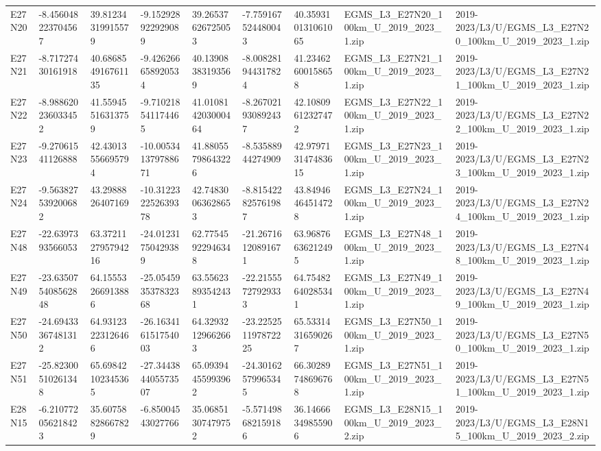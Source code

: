 \begin{landscape}
\begin{longtable}{lllllllll}
E27N20 & -8.456048223704567 & 39.81234319915579 & -9.152928922929089 & 39.26537626725053 & -7.759167524480043 & 40.359310131061065 & EGMS\_L3\_E27N20\_100km\_U\_2019\_2023\_1.zip & 2019-2023/L3/U/EGMS\_L3\_E27N20\_100km\_U\_2019\_2023\_1.zip \\
E27N21 & -8.71727430161918 & 40.686854916761135 & -9.426266658920534 & 40.13908383193569 & -8.008281944317824 & 41.23462600158658 & EGMS\_L3\_E27N21\_100km\_U\_2019\_2023\_1.zip & 2019-2023/L3/U/EGMS\_L3\_E27N21\_100km\_U\_2019\_2023\_1.zip \\
E27N22 & -8.988620236033452 & 41.55945516313759 & -9.710218541174465 & 41.010814203000464 & -8.267021930892437 & 42.10809612327472 & EGMS\_L3\_E27N22\_100km\_U\_2019\_2023\_1.zip & 2019-2023/L3/U/EGMS\_L3\_E27N22\_100km\_U\_2019\_2023\_1.zip \\
E27N23 & -9.27061541126888 & 42.43013556695794 & -10.005341379788671 & 41.88055798643226 & -8.53588944274909 & 42.979713147483615 & EGMS\_L3\_E27N23\_100km\_U\_2019\_2023\_1.zip & 2019-2023/L3/U/EGMS\_L3\_E27N23\_100km\_U\_2019\_2023\_1.zip \\
E27N24 & -9.563827539200682 & 43.2988826407169 & -10.312232252639378 & 42.74830063628653 & -8.815422825761987 & 43.84946464514728 & EGMS\_L3\_E27N24\_100km\_U\_2019\_2023\_1.zip & 2019-2023/L3/U/EGMS\_L3\_E27N24\_100km\_U\_2019\_2023\_1.zip \\
E27N48 & -22.6397393566053 & 63.372112795794216 & -24.01231750429389 & 62.77545922946348 & -21.26716120891671 & 63.96876636212495 & EGMS\_L3\_E27N48\_100km\_U\_2019\_2023\_1.zip & 2019-2023/L3/U/EGMS\_L3\_E27N48\_100km\_U\_2019\_2023\_1.zip \\
E27N49 & -23.635075408562848 & 64.15553266913886 & -25.054593537832368 & 63.55623893542431 & -22.21555727929333 & 64.75482640285341 & EGMS\_L3\_E27N49\_100km\_U\_2019\_2023\_1.zip & 2019-2023/L3/U/EGMS\_L3\_E27N49\_100km\_U\_2019\_2023\_1.zip \\
E27N50 & -24.69433367481312 & 64.93123223126466 & -26.163416151754003 & 64.32932129662663 & -23.225251197872225 & 65.53314316590267 & EGMS\_L3\_E27N50\_100km\_U\_2019\_2023\_1.zip & 2019-2023/L3/U/EGMS\_L3\_E27N50\_100km\_U\_2019\_2023\_1.zip \\
E27N51 & -25.82300510261348 & 65.69842102345365 & -27.344384405573507 & 65.09394455993962 & -24.30162579965345 & 66.30289748696768 & EGMS\_L3\_E27N51\_100km\_U\_2019\_2023\_1.zip & 2019-2023/L3/U/EGMS\_L3\_E27N51\_100km\_U\_2019\_2023\_1.zip \\
E28N15 & -6.210772056218423 & 35.60758828667829 & -6.85004543027766 & 35.06851307479752 & -5.571498682159186 & 36.14666349855906 & EGMS\_L3\_E28N15\_100km\_U\_2019\_2023\_2.zip & 2019-2023/L3/U/EGMS\_L3\_E28N15\_100km\_U\_2019\_2023\_2.zip \\

\end{longtable}
\end{landscape}
